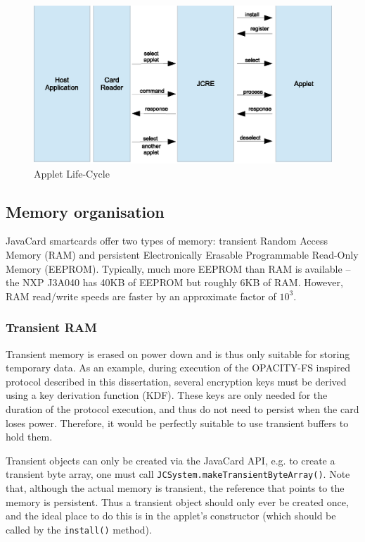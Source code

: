 \documentclass[12pt,a4paper,twoside,openright]{report}
\begin{document}
\begin{figure}[tbh]
\centerline{\includegraphics{figures/appletlifecycle.eps}}
\caption{Applet Life-Cycle}
\label{appletlifecycle}
\end{figure}

\subsection{Memory organisation} \label{javacardmemory}

JavaCard smartcards offer two types of memory: transient Random Access Memory (RAM) and persistent Electronically Erasable Programmable Read-Only Memory (EEPROM). Typically, much more EEPROM than RAM is available -- the NXP J3A040 has 40KB of EEPROM but roughly 6KB of RAM. However, RAM read/write speeds are faster by an approximate factor of $10^3$.

\subsubsection{Transient RAM}

Transient memory is erased on power down and is thus only suitable for storing temporary data. As an example, during execution of the OPACITY-FS inspired protocol described in this dissertation, several encryption keys must be derived using a key derivation function (KDF). These keys are only needed for the duration of the protocol execution, and thus do not need to persist when the card loses power. Therefore, it would be perfectly suitable to use transient buffers to hold them.

Transient objects can only be created via the JavaCard API, e.g. to create a transient byte array, one must call \texttt{JCSystem.makeTransientByteArray()}. Note that, although the actual memory is transient, the reference that points to the memory is persistent. Thus a transient object should only ever be created once, and the ideal place to do this is in the applet's constructor (which should be called by the \texttt{install()} method).
\end{document}
